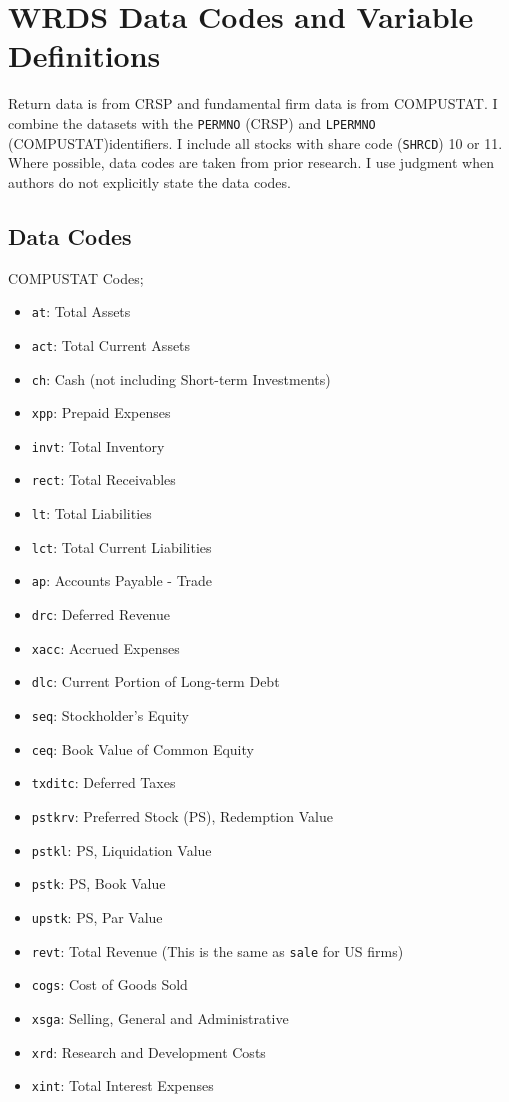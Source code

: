 
\section{WRDS Data Codes and Variable Definitions} \label{sec:datasuppl}

Return data is from CRSP and fundamental firm data is from COMPUSTAT.
I combine the datasets with the \texttt{PERMNO} (CRSP) and \texttt{LPERMNO} 
(COMPUSTAT)identifiers.
I include all stocks with share code (\texttt{SHRCD}) 10 or 11.
Where possible, data codes are taken from prior research.
I use judgment when authors do not explicitly state the data codes.

\subsection{Data Codes} \label{sec:datacodes}

COMPUSTAT Codes;
\begin{itemize}
  \item \texttt{at}: Total Assets
  \item \texttt{act}: Total Current Assets
  \item \texttt{ch}: Cash (not including Short-term Investments)
  \item \texttt{xpp}: Prepaid Expenses
  \item \texttt{invt}: Total Inventory
  \item \texttt{rect}: Total Receivables
  \item \texttt{lt}: Total Liabilities
  \item \texttt{lct}: Total Current Liabilities
  \item \texttt{ap}: Accounts Payable - Trade
  \item \texttt{drc}: Deferred Revenue
  \item \texttt{xacc}: Accrued Expenses
  \item \texttt{dlc}: Current Portion of Long-term Debt
  \item \texttt{seq}: Stockholder's Equity
  \item \texttt{ceq}: Book Value of Common Equity
  \item \texttt{txditc}: Deferred Taxes
  \item \texttt{pstkrv}: Preferred Stock (PS), Redemption Value
  \item \texttt{pstkl}: PS, Liquidation Value
  \item \texttt{pstk}: PS, Book Value
  \item \texttt{upstk}: PS, Par Value
  \item \texttt{revt}: Total Revenue (This is the same as \texttt{sale} for US firms)
  \item \texttt{cogs}: Cost of Goods Sold
  \item \texttt{xsga}: Selling, General and Administrative
  \item \texttt{xrd}: Research and Development Costs
  \item \texttt{xint}: Total Interest Expenses
\end{itemize}

